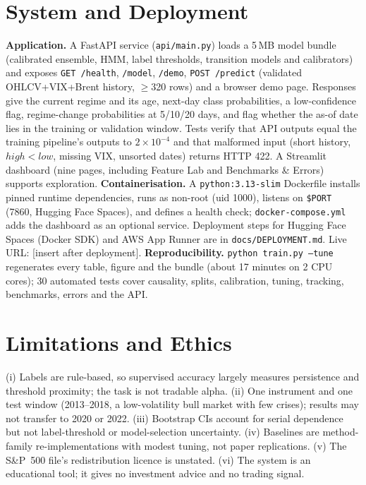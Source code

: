 \documentclass[conference]{IEEEtran}
\begin{document}
\section{System and Deployment}
\textbf{Application.} A FastAPI service (\texttt{api/main.py}) loads a 5\,MB model bundle (calibrated ensemble, HMM, label thresholds, transition models and calibrators) and exposes \texttt{GET /health}, \texttt{/model}, \texttt{/demo}, \texttt{POST /predict} (validated OHLCV+VIX+Brent history, $\ge$320 rows) and a browser demo page. Responses give the current regime and its age, next-day class probabilities, a low-confidence flag, regime-change probabilities at 5/10/20 days, and flag whether the as-of date lies in the training or validation window. Tests verify that API outputs equal the training pipeline's outputs to $2\times10^{-4}$ and that malformed input (short history, $high<low$, missing VIX, unsorted dates) returns HTTP 422. A Streamlit dashboard (nine pages, including Feature Lab and Benchmarks \& Errors) supports exploration.
\textbf{Containerisation.} A \texttt{python:3.13-slim} Dockerfile installs pinned runtime dependencies, runs as non-root (uid 1000), listens on \texttt{\$PORT} (7860, Hugging Face Spaces), and defines a health check; \texttt{docker-compose.yml} adds the dashboard as an optional service. Deployment steps for Hugging Face Spaces (Docker SDK) and AWS App Runner are in \texttt{docs/DEPLOYMENT.md}. Live URL: [insert after deployment].
\textbf{Reproducibility.} \texttt{python train.py --tune} regenerates every table, figure and the bundle (about 17 minutes on 2 CPU cores); 30 automated tests cover causality, splits, calibration, tuning, tracking, benchmarks, errors and the API.

\section{Limitations and Ethics}
(i) Labels are rule-based, so supervised accuracy largely measures persistence and threshold proximity; the task is not tradable alpha. (ii) One instrument and one test window (2013--2018, a low-volatility bull market with few crises); results may not transfer to 2020 or 2022. (iii) Bootstrap CIs account for serial dependence but not label-threshold or model-selection uncertainty. (iv) Baselines are method-family re-implementations with modest tuning, not paper replications. (v) The S\&P~500 file's redistribution licence is unstated. (vi) The system is an educational tool; it gives no investment advice and no trading signal.
\end{document}
